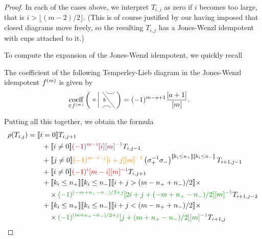 \documentclass[12pt]{article}
\begin{document}
\begin{proof}
In each of the cases above, we interpret $T_{i,j}$ as zero if $i$ becomes too large, that is $i > \lfloor (m-2)/2 \rfloor$. (This is of course justified by our having imposed that closed diagrams move freely, so the resulting $T_{i,j}$ has a Jones-Wenzl idempotent with cups attached to it.)

To compute the expansion of the Jones-Wenzl idempotent, we quickly recall
\begin{lem}
The coefficient of the following Temperley-Lieb diagram in the Jones-Wenzl idempotent $f^{(m)}$ is given by
\begin{align*}
\underset{\in \jw{m}}{\textrm{coeff}}
\left(
\begin{tikzpicture}[baseline = -.1cm, yscale=-.5]
	\draw (-.5,-.8)--(-.5,.8);
	\draw (-.3,.8) arc (-180:0:.2cm);
	\draw (-.3,-.8)--(.3,.8);
	\draw (-.1,-.8) arc (180:0:.2cm);
	\node at (-.7,0) {{\scriptsize{$a$}}};
	\node at (-.2,0) {{\scriptsize{$b$}}};
    \node at (.2,0) {$\phantom{c}$};
\end{tikzpicture}
\right)
& =
(-1)^{m-a+1}\frac{[a+1]}{[m]}.
\end{align*}
\end{lem}

  
Putting all this together, we obtain the formula
\begin{align*}
\rho(T_{i,j}) & =
\truth{i = 0} T_{i, j + 1} \\
& \qquad +
\truth{i \neq 0} \textcolor{purple}{(-1)^{m-i} [i][m]^{-1}} T_{i,j-1} \\
& \qquad +
\truth{j \neq 0}\textcolor{orange}{(-1)^{m-i-j} [i+j][m]^{-1}} \left(\sigma_+^{-1} \sigma_-\right)^{\truth{k_i \leq n_+} \truth{k_i \leq n_-}} T_{i+1, j-1} \\
& \qquad +
\truth{i \neq 0}\textcolor{red}{(-1)^{i}  [m-i][m]^{-1}} T_{i, j + 1} \\
& \qquad +
\truth{k_i \leq n_+} \truth{k_i \leq n_-}
\truth{i+j > (m - n_+ + n_-)/2} \times \\
& \qquad \quad \times \textcolor{DarkGreen}{(-1)^{(-m + n_+ - n_-)/2 + j} [2i + j + (-m + n_+ - n_-)/2][m]^{-1}} T_{i+1,j-2} \\
& \qquad +
\truth{k_i \leq n_+} \truth{k_i \leq n_-}
\truth{i+j < (m - n_+ + n_-)/2} \times \\
& \qquad \quad \times \textcolor{DarkGreen}{(-1)^{(m + n_+ - n_-)/2 + j} [j+ (m + n_+ - n_-)/2 ][m]^{-1}} T_{i+1,j}
\end{align*}


\end{proof}
\end{document}
